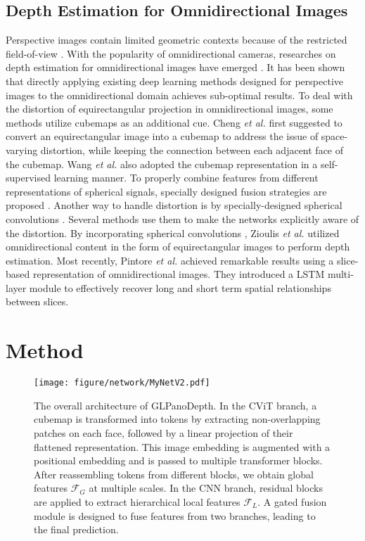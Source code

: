 \documentclass[10pt,twocolumn,letterpaper]{article}
\begin{document}
\subsection{Depth Estimation for Omnidirectional Images}
Perspective images contain limited geometric contexts because of the restricted field-of-view \cite{10.1007/978-3-319-10599-4_43}. With the popularity of omnidirectional cameras, researches on depth estimation for omnidirectional images have emerged \cite{Wang_2019_ICRA,Zou_2018_CVPR,10.1007/978-3-319-10599-4_43}. It has been shown that directly applying existing deep learning methods designed for perspective images to the omnidirectional domain achieves sub-optimal results.
To deal with the distortion of equirectangular projection in omnidirectional images, some methods utilize cubemaps as an additional cue. Cheng \emph{et al.} \cite{Cheng_2018_CVPR} first suggested to convert an equirectangular image into a cubemap to address the issue of space-varying distortion, while keeping the connection between each adjacent face of the cubemap. Wang \emph{et al.} \cite{Wang_2018_ACCV} also adopted the cubemap representation in a self-supervised learning manner. To properly combine features from different representations of spherical signals, specially designed fusion strategies are proposed \cite{9157424,9353978}. Another way to handle distortion is by specially-designed spherical convolutions \cite{NIPS2017_0c74b7f7,Su_2019_CVPR,s.2018spherical,10.1007/978-3-030-01240-3_32}. Several methods use them to make the networks explicitly aware of the distortion. By incorporating spherical convolutions \cite{NIPS2017_0c74b7f7}, Zioulis \emph{et al.} \cite{3D60} utilized omnidirectional content in the form of equirectangular images to perform depth estimation. Most recently, Pintore \emph{et al.} \cite{Pintore_2021_CVPR} achieved remarkable results using a slice-based representation of omnidirectional images. They introduced a LSTM multi-layer module \cite{10.5555/2969239.2969329} to effectively recover long and short term spatial relationships between slices. 




\section{Method}
\begin{figure*}[t]
  \centering
  
   \texttt{[image: figure/network/MyNetV2.pdf]}

   \caption{The overall architecture of GLPanoDepth. In the CViT branch, a cubemap is transformed into tokens by extracting non-overlapping patches on each face, followed by a linear projection of their flattened representation. This image embedding is augmented with a positional embedding and is passed to multiple transformer blocks. After reassembling tokens from different blocks, we obtain global features $\mathcal{F}_{G}$ at multiple scales. In the CNN branch, residual blocks are applied to extract hierarchical local features $\mathcal{F}_{L}$. A gated fusion module is designed to fuse features from two branches, leading to the final prediction.}
   \label{fig:network}
\end{figure*}
\end{document}

